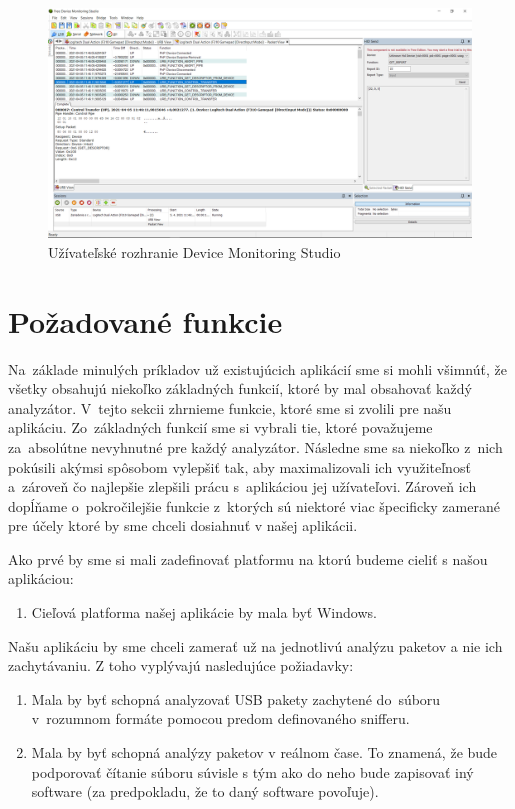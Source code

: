 \begin{figure}[!htb]
	\centering
	\includegraphics[width=\textwidth]{img/uvod_hhd_interface}
	\caption{Užívateľské rozhranie Device Monitoring Studio}
	\label{obr:uvod:hhd_interface}
\end{figure}

\newpage

\section{Požadované funkcie}
Na~základe minulých príkladov už existujúcich aplikácií sme si mohli všimnúť, že všetky obsahujú niekoľko základných funkcií, ktoré by mal obsahovať každý analyzátor. V~tejto sekcii zhrnieme funkcie, ktoré sme si zvolili pre našu aplikáciu. Zo~základných funkcií sme si vybrali tie, ktoré považujeme za~absolútne nevyhnutné pre každý analyzátor. Následne sme sa niekoľko z~nich pokúsili akýmsi spôsobom vylepšiť tak, aby maximalizovali ich využiteľnosť a~zároveň čo najlepšie zlepšili prácu s~aplikáciou jej užívateľovi. Zároveň ich dopĺňame o~pokročilejšie funkcie z~ktorých sú niektoré viac špecificky zamerané pre účely ktoré by sme chceli dosiahnuť v našej aplikácii.

Ako prvé by sme si mali zadefinovať platformu na ktorú budeme cieliť s našou aplikáciou:
\begin{enumerate}[label=\textbf{P\arabic*}]
	\item \label{uvod:poz:platforma} Cieľová platforma našej aplikácie by mala byť Windows. 
\end{enumerate}

Našu aplikáciu by sme chceli zamerať už na jednotlivú analýzu paketov a nie ich zachytávaniu. Z toho vyplývajú nasledujúce požiadavky:
\begin{enumerate}[label=\textbf{P\arabic*},resume]
	\item \label{uvod:poz:analyza} Mala by byť schopná analyzovať USB pakety zachytené do~súboru v~rozumnom formáte pomocou predom definovaného snifferu.
	\item \label{uvod:poz:analyza_real_time} Mala by byť schopná analýzy paketov v reálnom čase. To znamená, že bude podporovať čítanie súboru súvisle s tým ako do neho bude zapisovať iný software (za predpokladu, že to daný software povoľuje).
\end{enumerate}

